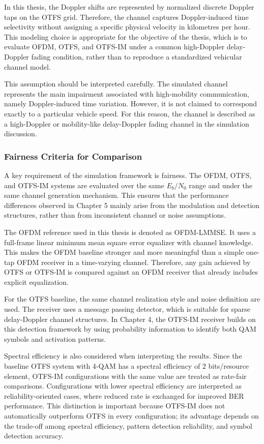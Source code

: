 In this thesis, the Doppler shifts are represented by normalized discrete Doppler taps on the OTFS grid. Therefore, the channel captures Doppler-induced time selectivity without assigning a specific physical velocity in kilometres per hour. This modeling choice is appropriate for the objective of the thesis, which is to evaluate OFDM, OTFS, and OTFS-IM under a common high-Doppler delay-Doppler fading condition, rather than to reproduce a standardized vehicular channel model.

This assumption should be interpreted carefully. The simulated channel represents the main impairment associated with high-mobility communication, namely Doppler-induced time variation. However, it is not claimed to correspond exactly to a particular vehicle speed. For this reason, the channel is described as a high-Doppler or mobility-like delay-Doppler fading channel in the simulation discussion.

\subsubsection{Fairness Criteria for Comparison}

A key requirement of the simulation framework is fairness. The OFDM, OTFS, and OTFS-IM systems are evaluated over the same \(E_b/N_0\) range and under the same channel generation mechanism. This ensures that the performance differences observed in Chapter 5 mainly arise from the modulation and detection structures, rather than from inconsistent channel or noise assumptions.

The OFDM reference used in this thesis is denoted as OFDM-LMMSE. It uses a full-frame linear minimum mean square error equalizer with channel knowledge. This makes the OFDM baseline stronger and more meaningful than a simple one-tap OFDM receiver in a time-varying channel. Therefore, any gain achieved by OTFS or OTFS-IM is compared against an OFDM receiver that already includes explicit equalization.

For the OTFS baseline, the same channel realization style and noise definition are used. The receiver uses a message passing detector, which is suitable for sparse delay-Doppler channel structures. In Chapter 4, the OTFS-IM receiver builds on this detection framework by using probability information to identify both QAM symbols and activation patterns.

Spectral efficiency is also considered when interpreting the results. Since the baseline OTFS system with 4-QAM has a spectral efficiency of \(2\) bits/resource element, OTFS-IM configurations with the same value are treated as rate-fair comparisons. Configurations with lower spectral efficiency are interpreted as reliability-oriented cases, where reduced rate is exchanged for improved BER performance. This distinction is important because OTFS-IM does not automatically outperform OTFS in every configuration; its advantage depends on the trade-off among spectral efficiency, pattern detection reliability, and symbol detection accuracy.

